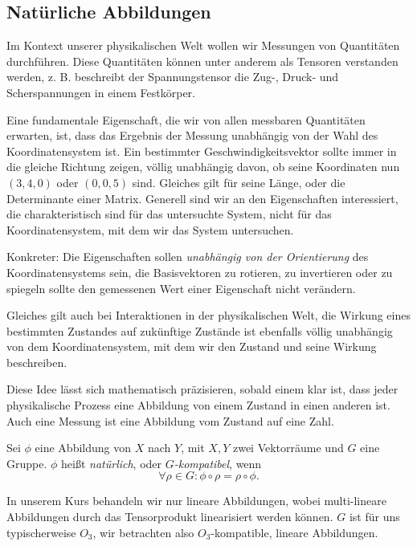 \subsection{Natürliche Abbildungen} 
Im Kontext unserer physikalischen Welt wollen wir Messungen von Quantitäten durchführen. Diese Quantitäten können unter anderem als Tensoren verstanden werden, z. B. beschreibt der Spannungstensor die Zug-, Druck- und Scherspannungen in einem Festkörper.

Eine fundamentale Eigenschaft, die wir von allen messbaren Quantitäten erwarten, ist, dass das Ergebnis der Messung unabhängig von der Wahl des Koordinatensystem ist. Ein bestimmter Geschwindigkeitsvektor sollte immer in die gleiche Richtung zeigen, völlig unabhängig davon, ob seine Koordinaten nun $(3,4,0)$ oder $(0,0,5)$ sind. Gleiches gilt für seine Länge, oder die Determinante einer Matrix. Generell sind wir an den Eigenschaften interessiert, die charakteristisch sind für das untersuchte System, nicht für das Koordinatensystem, mit dem wir das System untersuchen.

Konkreter: Die Eigenschaften sollen \emph{unabhängig von der Orientierung} des Koordinatensystems sein, die Basisvektoren zu rotieren, zu invertieren oder zu spiegeln sollte den gemessenen Wert einer Eigenschaft nicht verändern.

Gleiches gilt auch bei Interaktionen in der physikalischen Welt, die Wirkung eines bestimmten Zustandes auf zukünftige Zustände ist ebenfalls völlig unabhängig von dem Koordinatensystem, mit dem wir den Zustand und seine Wirkung beschreiben.

Diese Idee lässt sich mathematisch präzisieren, sobald einem klar ist, dass jeder physikalische Prozess eine Abbildung von einem Zustand in einen anderen ist. Auch eine Messung ist eine Abbildung vom Zustand auf eine Zahl.

\begin{definition}
	Sei $\phi$ eine Abbildung von $X$ nach $Y$, mit $X,Y$ zwei Vektorräume und $G$ eine Gruppe. $\phi$ heißt \emph{natürlich}, oder \emph{$G$-kompatibel}, wenn 
	\begin{equation*}
		\forall \rho\in G: \phi \circ \rho = \rho \circ \phi.
	\end{equation*}
\end{definition}
In unserem Kurs behandeln wir nur lineare Abbildungen, wobei multi-lineare Abbildungen durch das Tensorprodukt linearisiert werden können. $G$ ist für uns typischerweise $O_3$, wir betrachten also $O_3$-kompatible, lineare Abbildungen.

